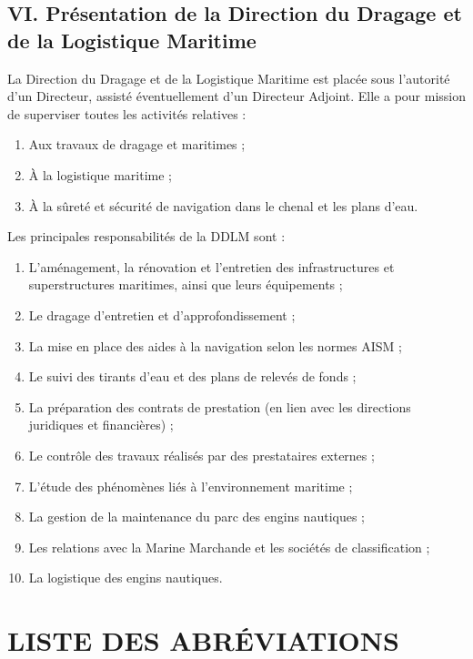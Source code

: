 \documentclass[a4paper,12pt,openany]{report}
\begin{document}
	\section*{VI. Présentation de la Direction du Dragage et de la Logistique Maritime }
	
	La Direction du Dragage et de la Logistique Maritime   est placée sous l’autorité d’un Directeur, assisté éventuellement d’un Directeur Adjoint. Elle a pour mission de superviser toutes les activités relatives :
	
	\begin{enumerate}
		\item Aux travaux de dragage et maritimes ;
		\item À la logistique maritime ;
		\item À la sûreté et sécurité de navigation dans le chenal et les plans d’eau.
	\end{enumerate}
	
	Les principales responsabilités de la DDLM sont :
	
	\begin{enumerate}
		\item L’aménagement, la rénovation et l’entretien des infrastructures et superstructures maritimes, ainsi que leurs équipements ;
		\item Le dragage d’entretien et d’approfondissement ;
		\item La mise en place des aides à la navigation selon les normes AISM ;
		\item Le suivi des tirants d’eau et des plans de relevés de fonds ;
		\item La préparation des contrats de prestation (en lien avec les directions juridiques et financières) ;
		\item Le contrôle des travaux réalisés par des prestataires externes ;
		\item L’étude des phénomènes liés à l’environnement maritime ;
		\item La gestion de la maintenance du parc des engins nautiques ;
		\item Les relations avec la Marine Marchande et les sociétés de classification ;
		\item La logistique des engins nautiques.
	\end{enumerate}
%	
%


 \chapter*{LISTE DES ABRÉVIATIONS}
    \label{ch:listedesabbrévations}
    
\end{document}
